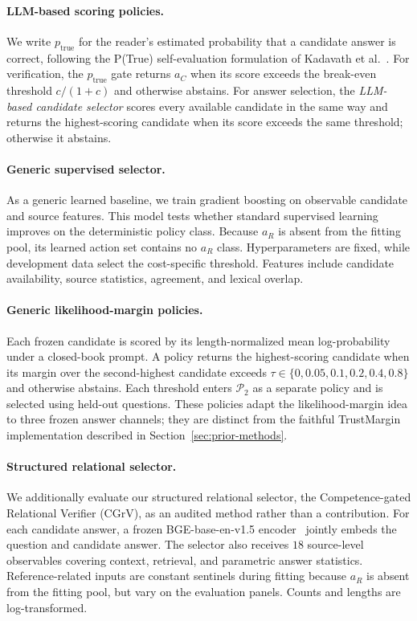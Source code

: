 \documentclass[sigconf]{acmart}
\newcommand{\ac}{a_C}
\newcommand{\ar}{a_R}
\begin{document}
\paragraph{LLM-based scoring policies.}
We write $p_{\mathrm{true}}$ for the reader's estimated probability
that a candidate answer is correct, following the P(True)
self-evaluation formulation of Kadavath et al.~\cite{kadavath2022know}.
For verification, the $p_{\mathrm{true}}$ gate returns $\ac$ when its
score exceeds the break-even threshold $c/(1+c)$ and otherwise
abstains. For answer selection, the \emph{LLM-based candidate selector}
scores every available candidate in the same way and returns the
highest-scoring candidate when its score exceeds the same threshold;
otherwise it abstains.

\paragraph{Generic supervised selector.}
As a generic learned baseline, we train gradient boosting on observable
candidate and source features. This model tests whether standard
supervised learning improves on the deterministic policy class.
Because $\ar$ is absent from the fitting pool, its learned action set
contains no $\ar$ class. Hyperparameters are fixed, while development
data select the cost-specific threshold. Features include candidate
availability, source statistics, agreement, and lexical overlap.

\paragraph{Generic likelihood-margin policies.}
Each frozen candidate is scored by its length-normalized mean
log-probability under a closed-book prompt. A policy returns the
highest-scoring candidate when its margin over the second-highest
candidate exceeds
$\tau\in\{0,0.05,0.1,0.2,0.4,0.8\}$ and otherwise abstains. Each
threshold enters $\mathcal P_2$ as a separate policy and is selected
using held-out questions. These policies adapt the likelihood-margin
idea to three frozen answer channels; they are distinct from the
faithful TrustMargin implementation described in
Section~\ref{sec:prior-methods}.

\paragraph{Structured relational selector.}
We additionally evaluate our structured relational selector, the
Competence-gated Relational Verifier (CGrV), as an audited method rather
than a contribution. For each candidate answer,
a frozen BGE-base-en-v1.5 encoder~\cite{xiao2023bge} jointly embeds the
question and candidate answer. The selector also receives $18$
source-level observables covering context, retrieval, and parametric
answer statistics. Reference-related inputs are constant sentinels
during fitting because $\ar$ is absent from the fitting pool, but vary
on the evaluation panels. Counts and lengths are log-transformed.
\end{document}
